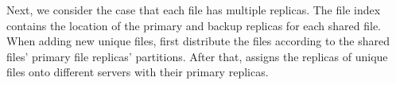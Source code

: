%
Next, we consider the case that each file has multiple replicas. The file
index contains the location of the primary and backup replicas for each shared file.
When adding new unique files, \sysname first distribute the files
according to the shared files' primary file replicas' partitions. After that,
\sysname assigns the replicas of unique files onto different servers with their primary
replicas.





